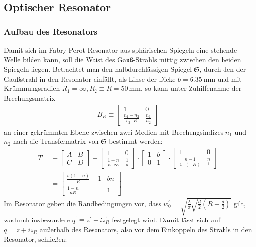 \documentclass[11pt,a4paper,oneside]{scrartcl}
\begin{document}
\subsection{Optischer Resonator}
\subsubsection{Aufbau des Resonators}
Damit sich im Fabry-Perot-Resonator aus sphärischen Spiegeln eine stehende Welle bilden kann, soll die Waist des Gauß-Strahls mittig zwischen den beiden Spiegeln liegen. Betrachtet man den halbdurchlässigen Spiegel $\mathfrak{S}$, durch den der Gaußstrahl in den Resonator einfällt, als Linse der Dicke $b=6.35\ \mathrm{mm}$ und mit Krümmungsradien $R_1=\infty,R_2\equiv R=50\ \mathrm{mm}$, so kann unter Zuhilfenahme der Brechungsmatrix 
\begin{align}
B_R\equiv \begin{bmatrix}
1 & 0\\
\frac{n_1-n_2}{n_2\cdot R} & \frac{n_1}{n_2}
\end{bmatrix} 
\end{align}
an einer gekrümmten Ebene zwischen zwei Medien mit Brechungsindizes $n_1$ und $n_2$
nach \cite{dewiki:225621757} die Transfermatrix von $\mathfrak{S}$ bestimmt werden:
\begin{align}
T & \equiv
\begin{bmatrix}
A & B\\
C & D 
\end{bmatrix} 
\equiv
\begin{bmatrix}
1 & 0\\
\frac{1-n}{n\cdot \infty} & \frac{1}{n}
\end{bmatrix} 
\cdot
\begin{bmatrix}
1 & b\\
0 & 1
\end{bmatrix} 
\cdot
\begin{bmatrix}
1 & 0\\
\frac{n-1}{1\cdot(- R)} & \frac{n}{1}
\end{bmatrix} 
\\ \quad& = \begin{bmatrix}
\frac{b(1-n)}{R}+1 & bn\\
\frac{1-n}{nR} & 1
\end{bmatrix}
\end{align}
Im Resonator geben die Randbedingungen vor, dass $w_0^\prime=\sqrt{\frac{\lambda}{\pi}\sqrt{\frac{d}{2}\left(R-\frac{d}{2}\right)}}$ gilt, wodurch insbesondere $q^\prime\equiv z^\prime+iz_R^\prime$ festgelegt wird. Damit lässt sich auf $q=z+iz_R$ außerhalb des Resonators, also vor dem Einkoppeln des Strahls in den Resonator, schließen:
\end{document}
